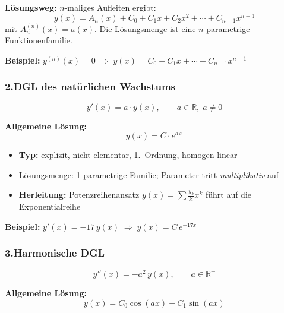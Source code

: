 \documentclass[../../zusammenfassung_AN.tex]{subfiles}
\begin{document}
	\begin{tcolorbox}[formelbox]
		\textbf{Lösungsweg:} $n$-maliges Aufleiten ergibt:
		\[
		y(x) = A_n(x) + C_0 + C_1 x + C_2 x^2 + \cdots + C_{n-1}x^{n-1}
		\]
		mit $A_n^{(n)}(x)=a(x)$. Die Lösungsmenge ist eine $n$-parametrige Funktionenfamilie.
	\end{tcolorbox}
	
	\textbf{Beispiel:} $y^{(n)}(x)=0 \;\Rightarrow\; y(x) = C_0 + C_1 x + \cdots + C_{n-1}x^{n-1}$
	
	\vspace{0.8em}
	
	\subsubsection*{\color{mainblue}2.\quad DGL des natürlichen Wachstums}
	
	\[
	y'(x) = a \cdot y(x), \qquad a \in \mathbb{R},\; a \neq 0
	\]
	
	\begin{tcolorbox}[formelbox]
		\textbf{Allgemeine Lösung:}
		\[
		\boxed{y(x) = C \cdot e^{a\,x}}
		\]
	\end{tcolorbox}
	
	\begin{itemize}[noitemsep, topsep=2pt]
		\item \textbf{Typ:} explizit, nicht elementar, 1.\ Ordnung, homogen linear
		\item Lösungsmenge: 1-parametrige Familie; Parameter tritt \emph{multiplikativ} auf
		\item \textbf{Herleitung:} Potenzreihenansatz $y(x)=\sum \frac{y_k}{k!}x^k$ führt auf die Exponentialreihe
	\end{itemize}
	
	\textbf{Beispiel:} $y'(x)=-17\,y(x) \;\Rightarrow\; y(x)=C\,e^{-17x}$
	
	\vspace{0.8em}
	
	\subsubsection*{\color{mainblue}3.\quad Harmonische DGL}
	
	\[
	y''(x) = -a^2\,y(x), \qquad a \in \mathbb{R}^+
	\]
	
	\begin{tcolorbox}[formelbox]
		\textbf{Allgemeine Lösung:}
		\[
		\boxed{y(x) = C_0\cos(ax) + C_1\sin(ax)}
		\]
	\end{tcolorbox}
	
\end{document}

